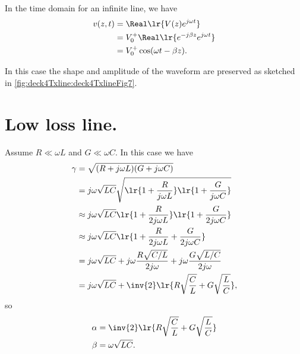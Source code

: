 In the time domain for an infinite line, we have
\begin{equation}\label{eqn:uwaves4TransmissionLines:620}
\begin{aligned}
v(z, t)
&= \Real\lr{ V(z) e^{j \omega t} }
\\ &= V_0^{+} \Real\lr{ e^{-j \beta z} e^{j \omega t} }
\\ &= V_0^{+} \cos( \omega t - \beta z ).
\end{aligned}
\end{equation}

In this case the shape and amplitude of the waveform are preserved as sketched in \cref{fig:deck4Txline:deck4TxlineFig7}.
\section{Low loss line.}
Assume \( R \ll \omega L \) and \( G \ll \omega C \).  In this case we have
\begin{equation}\label{eqn:uwaves4TransmissionLines:640}
\begin{aligned}
\gamma
&= \sqrt{ (R + j \omega L) ( G + j \omega C ) }
\\ &=
j \omega \sqrt{L C} \sqrt{
\lr{ 1 + \frac{R}{j\omega L} }
\lr{ 1 + \frac{G}{j\omega C} }
} \\
&\approx
j \omega \sqrt{L C}
\lr{ 1 + \frac{R}{2 j\omega L} }
\lr{ 1 + \frac{G}{2 j\omega C} } \\
&\approx
j \omega \sqrt{L C}
\lr{ 1 + \frac{R}{2 j\omega L}  + \frac{G}{2 j\omega C} }
\\ &=
j \omega \sqrt{L C}
+ j \omega \frac{R \sqrt{C/L}}{2 j\omega}
+ j \omega \frac{G \sqrt{L/C}}{2 j\omega}
\\ &=
j \omega \sqrt{L C}
+
\inv{2} \lr{
R \sqrt{\frac{C}{L}}
+
G \sqrt{\frac{L}{C}}
},
\end{aligned}
\end{equation}
so
\begin{equation}\label{eqn:uwaves4TransmissionLines:660}
\begin{aligned}
\alpha &=
\inv{2} \lr{
R \sqrt{\frac{C}{L}}
+
G \sqrt{\frac{L}{C}}
} \\
\beta &= \omega \sqrt{L C}.
\end{aligned}
\end{equation}


